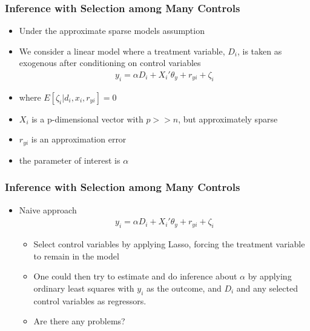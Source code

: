 \documentclass[
  shownotes,
  xcolor={svgnames},
  hyperref={colorlinks,citecolor=DarkBlue,linkcolor=DarkRed,urlcolor=DarkBlue}
  , aspectratio=169]{beamer}
\begin{document}
\begin{frame}[fragile]
\frametitle{Inference with Selection among Many Controls}

\begin{itemize}
  \item Under the approximate sparse models assumption
  \medskip
  \item We consider a linear model where a treatment variable, $D_i$, is taken as exogenous after conditioning on control variables
\begin{align}
y_i = \alpha D_i + X_i'\theta_y +r_{yi} + \zeta_i
\end{align}

\item where $E[\zeta_i|d_i,x_i,r_{yi}]=0$ 
\item $X_i$ is a p-dimensional vector with $p>>n$, but approximately sparse
\item $r_{yi}$ is an approximation error
\item the parameter of interest is $\alpha$

\end{itemize}
\end{frame}
\begin{frame}[fragile]
\frametitle{Inference with Selection among Many Controls}


\begin{itemize}
  \item Naive approach 
  \begin{align}
    y_i = \alpha D_i + X_i'\theta_y +r_{yi} + \zeta_i
  \end{align}
  \begin{itemize}
  \item Select control variables by applying Lasso, forcing the treatment variable to remain in the model
  \medskip
  \item  One could then try to estimate and do inference about $\alpha$ by applying ordinary least squares with $y_i$ as the outcome, and $D_i$ and any selected control variables as regressors. 
  \medskip
  \pause
  \item Are there any problems?
  \end{itemize}
\end{itemize}

\end{frame}
\end{document}
